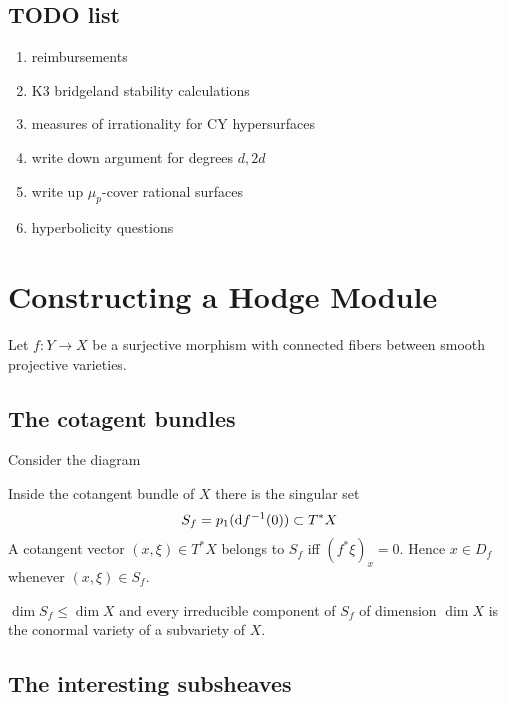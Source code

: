 \documentclass[12pt]{article}
\begin{document}
\subsection{TODO list}

\begin{enumerate}
\item reimbursements
\item K3 bridgeland stability calculations
\item measures of irrationality for CY hypersurfaces
\item write down argument for degrees $d,2d$
\item write up $\mu_p$-cover rational surfaces
\item hyperbolicity questions
\end{enumerate}


\section{Constructing a Hodge Module}

Let $f : Y \to X$ be a surjective morphism with connected fibers between smooth projective varieties.

\subsection{The cotagent bundles}

Consider the diagram
\begin{center}
\end{center}
Inside the cotangent bundle of $X$ there is the singular set
\[ S_f = p_1(\mathrm{d}{f}^{-1}(0)) \subset T^* X \]
A cotangent vector $(x, \xi) \in T^* X$ belongs to $S_f$ iff $(f^* \xi)_x = 0$. Hence $x \in D_f$ whenever $(x, \xi) \in S_f$. 

\begin{lemma}
$\dim{S_f} \le \dim{X}$ and every irreducible component of $S_f$ of dimension $\dim{X}$ is the conormal variety of a subvariety of $X$.
\end{lemma}

\subsection{The interesting subsheaves}
\end{document}
